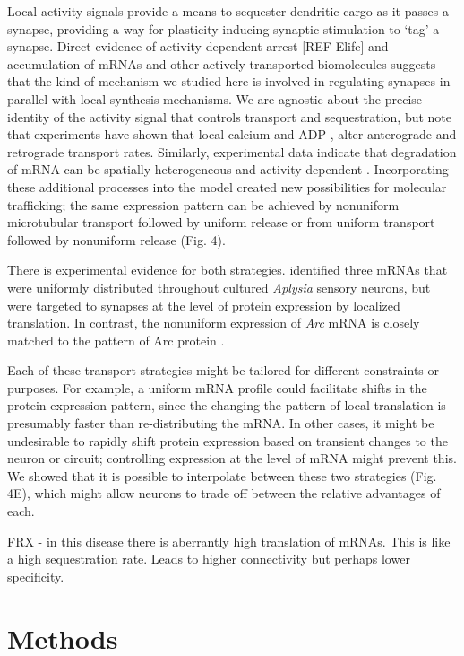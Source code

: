 \documentclass[fleqn,10pt]{wlpeerj}
\begin{document}
Local activity signals provide a means to sequester dendritic cargo as it passes a synapse, providing a way for plasticity-inducing synaptic stimulation to `tag' a synapse. Direct evidence of activity-dependent arrest [REF Elife] and accumulation \citep{Krichevsky_2001,Buxbaum_2014a} of mRNAs and other actively transported biomolecules suggests that the kind of mechanism we studied here is involved in regulating synapses in parallel with local synthesis mechanisms. We are agnostic about the precise identity of the activity signal that controls transport and sequestration, but note that experiments have shown that local calcium \citep{Wang_2009} and ADP \citep{Mironov_2007}, alter anterograde and retrograde transport rates. Similarly, experimental data indicate that degradation of mRNA can be spatially heterogeneous and activity-dependent \citep{Farris_2014}. Incorporating these additional processes into the model created new possibilities for molecular trafficking; the same expression pattern can be achieved by nonuniform microtubular transport followed by uniform release or from uniform transport followed by nonuniform release (Fig. 4).

There is experimental evidence for both strategies. \cite{Kim_2015} identified three mRNAs that were uniformly distributed throughout cultured \textit{Aplysia} sensory neurons, but were targeted to synapses at the level of protein expression by localized translation. In contrast, the nonuniform expression of \textit{Arc} mRNA is closely matched to the pattern of Arc protein \citep{Farris_2014, Steward_2015}. 

Each of these transport strategies might be tailored for different constraints or purposes. For example, a uniform mRNA profile could facilitate shifts in the protein expression pattern, since the changing the pattern of local translation is presumably faster than re-distributing the mRNA. In other cases, it might be undesirable to rapidly shift protein expression based on transient changes to the neuron or circuit; controlling expression at the level of mRNA might prevent this. We showed that it is possible to interpolate between these two strategies (Fig. 4E), which might allow neurons to trade off between the relative advantages of each.

FRX - in this disease there is aberrantly high translation of mRNAs. This is like a high sequestration rate. Leads to higher connectivity but perhaps lower specificity.

\section*{Methods}
\end{document}
